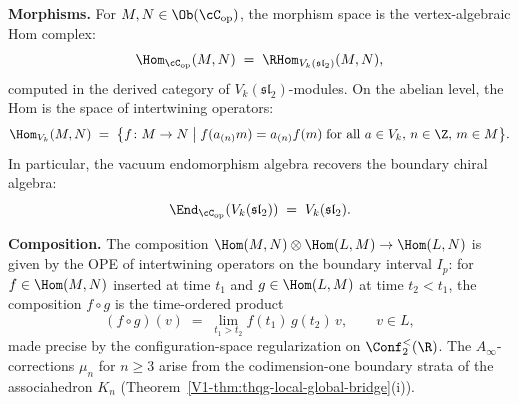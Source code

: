 \begin{definition}
\medskip\noindent
\textbf{Morphisms.}
For $M, N \in \Ob(\cC_{\mathrm{op}})$, the morphism space is the
vertex-algebraic Hom complex:
\begin{equation}\label{eq:benchmark-Cop-morphisms}
 \Hom_{\cC_{\mathrm{op}}}(M, N)
 \;=\;
 \RHom_{V_k(\mathfrak{sl}_2)}(M, N),
\end{equation}
computed in the derived category of $V_k(\mathfrak{sl}_2)$-modules.
On the abelian level, the Hom is the space of intertwining operators:
\begin{equation}\label{eq:benchmark-Cop-hom-abelian}
 \Hom_{V_k}(M, N)
 \;=\;
 \bigl\{
 f \colon M \to N
 \;\big|\;
 f(a_{(n)} m) = a_{(n)} f(m)
 \;\text{for all } a \in V_k,\, n \in \Z,\, m \in M
 \bigr\}.
\end{equation}
In particular, the vacuum endomorphism algebra recovers the
boundary chiral algebra:
\begin{equation}\label{eq:benchmark-Cop-vacuum-end}
 \End_{\cC_{\mathrm{op}}}(V_k(\mathfrak{sl}_2))
 \;=\;
 V_k(\mathfrak{sl}_2).
\end{equation}

\medskip\noindent
\textbf{Composition.}
The composition
$\Hom(M,N) \otimes \Hom(L,M) \to \Hom(L,N)$ is given by
the OPE of intertwining operators on the boundary interval
$I_p$: for $f \in \Hom(M,N)$ inserted at time $t_1$ and
$g \in \Hom(L,M)$ at time $t_2 < t_1$, the composition
$f \circ g$ is the time-ordered product
\begin{equation}\label{eq:benchmark-Cop-composition}
 (f \circ g)(v)
 \;=\;
 \lim_{t_1 > t_2}
 f(t_1)\, g(t_2)\, v,
 \qquad v \in L,
\end{equation}
made precise by the configuration-space regularization on
$\Conf^{<}_2(\R)$. The $A_\infty$-corrections $\mu_n$ for
$n \ge 3$ arise from the codimension-one boundary strata of
the associahedron $K_n$
(Theorem~\ref*{V1-thm:thqg-local-global-bridge}(i)).


\end{definition}
